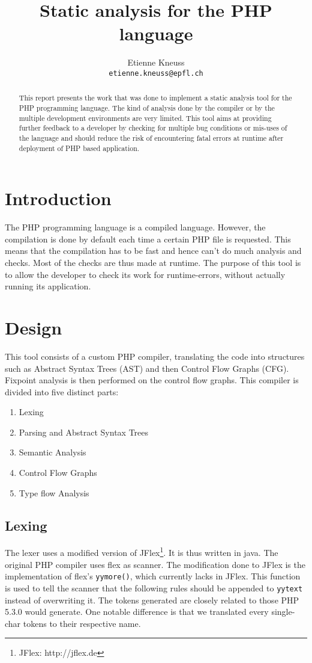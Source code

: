 \documentclass[a4paper]{article}
\author{Etienne Kneuss\\
\texttt{etienne.kneuss@epfl.ch}
}
\title{Static analysis for the PHP language}
\begin{document}
\maketitle
\begin{abstract}
  This report presents the work that was done to implement a static analysis
  tool for the PHP programming language. The kind of analysis done by the
  compiler or by the multiple development environments are very limited. This
  tool aims at providing further feedback to a developer by checking for
  multiple bug conditions or mis-uses of the language and should reduce the
  risk of encountering fatal errors at runtime after deployment of PHP based
  application.
\end{abstract}
\section{Introduction}
The PHP programming language is a compiled language. However, the compilation is
done by default each time a certain PHP file is requested. This means that the
compilation has to be fast and hence can't do much analysis and checks. Most of
the checks are thus made at runtime. The purpose of this tool is to allow the
developer to check its work for runtime-errors, without actually running its
application.
\section{Design}
This tool consists of a custom PHP compiler, translating the code
into structures such as Abstract Syntax Trees (AST) and then Control Flow Graphs
(CFG). Fixpoint analysis is then performed on the control flow graphs. This
compiler is divided into five distinct parts:
\begin{enumerate}
  \item Lexing
  \item Parsing and Abstract Syntax Trees
  \item Semantic Analysis
  \item Control Flow Graphs
  \item Type flow Analysis
\end{enumerate}

\subsection{Lexing}
The lexer uses a modified version of JFlex\footnote{JFlex: http://jflex.de}. It
is thus written in java. The original PHP compiler uses flex as scanner. The
modification done to JFlex is the implementation of flex's \verb=yymore()=,
which currently lacks in JFlex. This function is used to tell the scanner that
the following rules should be appended to \verb=yytext= instead of overwriting
it. The tokens generated are closely related to those PHP 5.3.0 would generate.
One notable difference is that we translated every single-char tokens to their
respective name.
\end{document}
